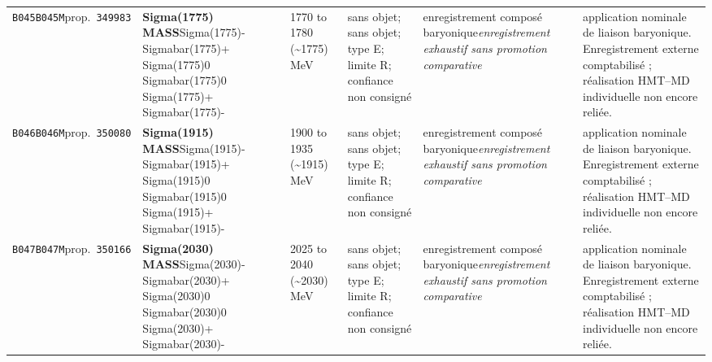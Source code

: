 \begin{landscape}
\begin{longtable}{L{1.85cm}L{4.45cm}L{2.35cm}L{4.05cm}L{3.35cm}L{7.15cm}}
\texttt{B045}\newline \texttt{B045M}\newline prop.\ \texttt{349983} & \textbf{Sigma(1775) MASS}\newline Sigma(1775)- \textbar{}\allowbreak{} Sigmabar(1775)+ \textbar{}\allowbreak{} Sigma(1775)0 \textbar{}\allowbreak{} Sigmabar(1775)0 \textbar{}\allowbreak{} Sigma(1775)+ \textbar{}\allowbreak{} Sigmabar(1775)- & 1770 to 1780 (\textasciitilde{}1775)\,MeV & sans objet; sans objet; type E; limite R; confiance non consigné & enregistrement composé baryonique\newline \emph{enregistrement exhaustif sans promotion comparative} & application nominale de liaison baryonique. Enregistrement externe comptabilisé ; réalisation HMT--MD individuelle non encore reliée. \\
\texttt{B046}\newline \texttt{B046M}\newline prop.\ \texttt{350080} & \textbf{Sigma(1915) MASS}\newline Sigma(1915)- \textbar{}\allowbreak{} Sigmabar(1915)+ \textbar{}\allowbreak{} Sigma(1915)0 \textbar{}\allowbreak{} Sigmabar(1915)0 \textbar{}\allowbreak{} Sigma(1915)+ \textbar{}\allowbreak{} Sigmabar(1915)- & 1900 to 1935 (\textasciitilde{}1915)\,MeV & sans objet; sans objet; type E; limite R; confiance non consigné & enregistrement composé baryonique\newline \emph{enregistrement exhaustif sans promotion comparative} & application nominale de liaison baryonique. Enregistrement externe comptabilisé ; réalisation HMT--MD individuelle non encore reliée. \\
\texttt{B047}\newline \texttt{B047M}\newline prop.\ \texttt{350166} & \textbf{Sigma(2030) MASS}\newline Sigma(2030)- \textbar{}\allowbreak{} Sigmabar(2030)+ \textbar{}\allowbreak{} Sigma(2030)0 \textbar{}\allowbreak{} Sigmabar(2030)0 \textbar{}\allowbreak{} Sigma(2030)+ \textbar{}\allowbreak{} Sigmabar(2030)- & 2025 to 2040 (\textasciitilde{}2030)\,MeV & sans objet; sans objet; type E; limite R; confiance non consigné & enregistrement composé baryonique\newline \emph{enregistrement exhaustif sans promotion comparative} & application nominale de liaison baryonique. Enregistrement externe comptabilisé ; réalisation HMT--MD individuelle non encore reliée. \\

\end{longtable}
\end{landscape}
